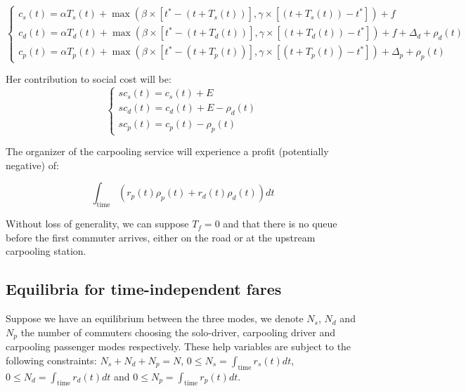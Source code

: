 \documentclass[english, a4paper]{article}
\theoremstyle{plain}
\theoremstyle{definition}
\theoremstyle{remark}
\begin{document}

\begin{equation}
\left\{
\begin{array}{l}
    c_s(t) = \alpha T_s(t) + \max (\beta \times [t^* - (t + T_s(t))], \gamma \times [(t + T_s(t)) - t^*]) + f\\
    c_d(t) = \alpha T_d(t) + \max (\beta \times [t^* - (t + T_d(t))], \gamma \times [(t + T_d(t)) - t^*]) + f + \Delta _d + \rho _d (t)\\
    c_p(t) = \alpha T_p(t) + \max (\beta \times [t^* - (t + T_p(t))], \gamma \times [(t + T_p(t)) - t^*]) + \Delta _p + \rho _p (t)
\end{array}
\right.
\end{equation}

Her contribution to social cost will be:
\begin{equation}
    \left\{
    \begin{array}{l}
        sc_s(t) = c_s(t) + E\\
        sc_d(t) = c_d(t) + E - \rho _d (t)\\
        sc_p(t) = c_p(t) - \rho _p(t)
    \end{array}
    \right.
    \end{equation}

The organizer of the carpooling service will experience a profit (potentially negative) of:

\begin{equation}
    \int_{\text{time}} (r_p(t) \rho _p(t) + r_d(t) \rho _d(t)) dt
\end{equation}

Without loss of generality, we can suppose $T_f = 0$ and that there is no queue before the first commuter arrives, either on the road or at the upstream carpooling station.


\subsection{Equilibria for time-independent fares}

Suppose we have an equilibrium between the three modes, we denote $N_s$, $N_d$ and $N_p$ the number of commuters choosing the solo-driver, carpooling driver and carpooling passenger modes respectively. These help variables are subject to the following constraints: $N_s + N_d + N_p = N$, $0 \leq N_s = \int_{\text{time}} r_s(t) dt$, $0 \leq N_d = \int_{\text{time}} r_d(t) dt$ and $0 \leq N_p = \int_{\text{time}} r_p(t) dt$.
\end{document}
